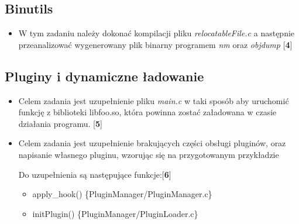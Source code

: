 \documentclass[12pt]{article}
\begin{document}
\subsection{Binutils}
\begin{itemize}
\item W tym zadaniu należy dokonać kompilacji pliku \textit{relocatableFile.c} a
  następnie przeanalizować wygenerowany plik binarny programem \textit{nm} oraz
  \textit{objdump} [\textbf{4}]
\end{itemize}

\subsection{Pluginy i dynamiczne ładowanie}
\begin{itemize}
\item Celem zadania jest uzupełnienie pliku \textit{main.c} w taki sposób aby
  uruchomić funkcję z biblioteki libfoo.so, która powinna zostać załadowana w
  czasie działania programu. [\textbf{5}]

\item Celem zadania jest uzupełnienie brakujących części obsługi pluginów, oraz
  napisanie własnego pluginu, wzorując się na przygotowanym przykładzie

  Do uzupełnienia są następujące funkcje:[\textbf{6}]

  \begin{itemize}
  \item apply\_hook() \{PluginManager/PluginManager.c\}
  \item initPlugin() \{PluginManager/PluginLoader.c\}
  \end{itemize}
\end{itemize}
\end{document}
